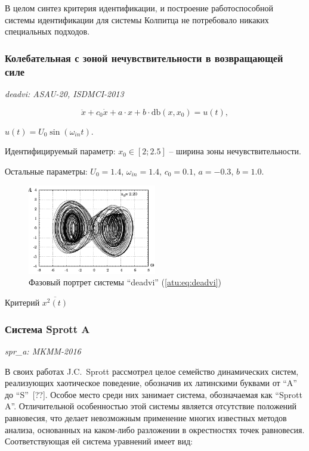 \documentclass[a4paper,12pt]{article}
\newcommand{\LinkRef}[1]{ \textit{#1} }
\begin{document}
В целом синтез критерия идентификации, и построение работоспособной системы идентификации для
системы Колпитца не потребовало никаких специальных подходов.


\FloatBarrier

\subsubsection{Колебательная с зоной нечувствительности в возвращающей силе} %

\LinkRef{
  deadvi: ASAU-20, ISDMCI-2013
}

\begin{equation}
\ddot{x} + c_0 \dot{x} + a \cdot x + b \cdot \mathrm{db}(x,x_0) = u(t),
\label{atu:eq:deadvi}
\end{equation}

$ u(t) = U_0 \sin( \omega_{in} t ) $.

Идентифицируемый параметр:
$ x_0 \in [2;2.5] $ -- ширина зоны нечувствительности.

Остальные параметры:
$U_0 = 1.4$, $\omega_{in} = 1.4$, $c_0=0.1$, $a=-0.3$, $b=1.0$.


\begin{figure}[htb!]
\centerline{\includegraphics[width=0.5\textwidth]{p/cha/deadvi_phase.pdf} }
\caption{Фазовый портрет системы ``deadvi'' (\ref{atu:eq:deadvi})}
\label{atu:f:deadvi_phase}
\end{figure}

Критерий
$\overline{x^2(t)}$


\FloatBarrier
\subsubsection{Система Sprott A}

\LinkRef{
  spr\_a: MKMM-2016
}

В своих работах J.C.~Sprott рассмотрел целое семейство динамических
систем, реализующих хаотическое поведение, обозначив их латинскими буквами
от ``A'' до ``S''~[??]. Особое место среди них
занимает система, обозначаемая как ``Sprott A''. Отличительной особенностью
этой системы является отсутствие положений равновесия, что делает
невозможным применение многих известных методов анализа, основанных на
каком-либо разложении в окрестностях точек равновесия. Соответствующая ей
система уравнений имеет вид:
\end{document}
